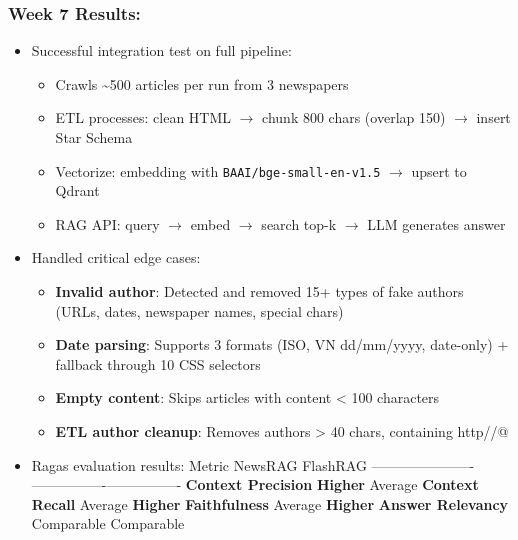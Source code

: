 \hypertarget{week-7-results}{%
\subsubsection{Week 7 Results:}}

\begin{itemize}
\item
  Successful integration test on full pipeline:

  \begin{itemize}
  \tightlist
  \item
    Crawls \textasciitilde500 articles per run from 3 newspapers
  \item
    ETL processes: clean HTML \(\rightarrow\) chunk 800 chars (overlap
    150) \(\rightarrow\) insert Star Schema
  \item
    Vectorize: embedding with \texttt{BAAI/bge-small-en-v1.5}
    \(\rightarrow\) upsert to Qdrant
  \item
    RAG API: query \(\rightarrow\) embed \(\rightarrow\) search top-k
    \(\rightarrow\) LLM generates answer
  \end{itemize}
\item
  Handled critical edge cases:

  \begin{itemize}
  \tightlist
  \item
    \textbf{Invalid author}: Detected and removed 15+ types of fake
    authors (URLs, dates, newspaper names, special chars)
  \item
    \textbf{Date parsing}: Supports 3 formats (ISO, VN dd/mm/yyyy,
    date-only) + fallback through 10 CSS selectors
  \item
    \textbf{Empty content}: Skips articles with content \textless{} 100
    characters
  \item
    \textbf{ETL author cleanup}: Removes authors \textgreater{} 40
    chars, containing http/\textbar/@
  \end{itemize}
\item
  Ragas evaluation results: \textbar{} Metric \textbar{} NewsRAG
  \textbar{} FlashRAG \textbar{}
  \textbar----------------------\textbar----------------\textbar----------------\textbar{}
  \textbar{} \textbf{Context Precision} \textbar{} \textbf{Higher}
  \textbar{} Average \textbar{} \textbar{} \textbf{Context Recall}
  \textbar{} Average \textbar{} \textbf{Higher} \textbar{} \textbar{}
  \textbf{Faithfulness} \textbar{} Average \textbar{} \textbf{Higher}
  \textbar{} \textbar{} \textbf{Answer Relevancy} \textbar{} Comparable
  \textbar{} Comparable \textbar{}


\end{itemize}
